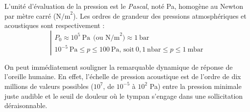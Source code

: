 
L'unité d'évaluation de la pression est le \emph{Pascal}, noté Pa,
homogène au Newton par mètre carré ($\mbox{N/m}^{2}$).
Les ordres de grandeur des pressions atmosphériques et acoustiques sont respectivement :
\begin{equation}
\left |
\begin{array}{l}
P_{0} \approx 10^{5} ~\mbox{Pa} ~~\mbox{(ou N/m}^{2}) \approx 1 ~\mbox{bar} \\[1ex]
10^{-5} ~\mbox{Pa} \leq p \leq 100 ~\mbox{Pa} \mbox{, soit} ~ 0,1~\mbox{nbar} \leq p \leq 1~\mbox{mbar}
\end{array}
\right.
\label{eq:V.2}
\end{equation}

On peut immédiatement souligner la remarquable dynamique de réponse de l'oreille humaine. En effet, l'échelle de pression acoustique est de l'ordre de dix millions de valeurs possibles ($10^{7}$, de $10^{-5}$ à $10^{2}$ Pa) entre la pression minimale juste audible et le seuil de douleur où le tympan s'engage dans une sollicitation déraisonnable.

